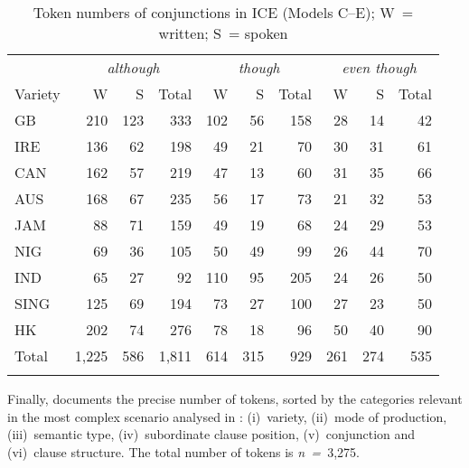 \begin{table}
\caption{\label{tab:A.4}Token numbers of conjunctions in ICE (Models C–E); W~= written; S~= spoken}
\begin{tabular}{l *3{rrr}}
\lsptoprule
& \multicolumn{3}{c}{{\itshape although}} & \multicolumn{3}{c}{{\itshape though}} & \multicolumn{3}{c}{{\itshape even though}}\\\cmidrule(lr){2-4}\cmidrule(lr){5-7}\cmidrule(lr){8-10}
Variety & W & S & Total  &  W & S & Total  &  W & S & Total\\\midrule
GB & 210 & 123 & 333  &  102 & 56 & 158  &  28 & 14 & 42\\
IRE & 136 & 62 & 198  &  49 & 21 & 70  &  30 & 31 & 61\\
CAN & 162 & 57 & 219  &  47 & 13 & 60  &  31 & 35 & 66\\
AUS & 168 & 67 & 235  &  56 & 17 & 73  &  21 & 32 & 53\\
JAM & 88 & 71 & 159  &  49 & 19 & 68  &  24 & 29 & 53\\
NIG & 69 & 36 & 105  &  50 & 49 & 99  &  26 & 44 & 70\\
IND & 65 & 27 & 92  &  110 & 95 & 205  &  24 & 26 & 50\\
SING & 125 & 69 & 194  &  73 & 27 & 100  &  27 & 23 & 50\\
HK & 202 & 74 & 276  &  78 & 18 & 96  &  50 & 40 & 90\\\midrule
Total & 1,225 & 586 & 1,811  &  614 & 315 & 929  &  261 & 274 & 535\\
\lspbottomrule
\end{tabular}
\end{table}


Finally,  documents the precise number of tokens, sorted by the categories relevant in the most complex scenario analysed in : (i)~variety, (ii)~mode of production, (iii)~semantic type, (iv)~subordinate clause position, (v)~conjunction and (vi)~clause structure. The total number of tokens is \textit{n~=~}3,275.

